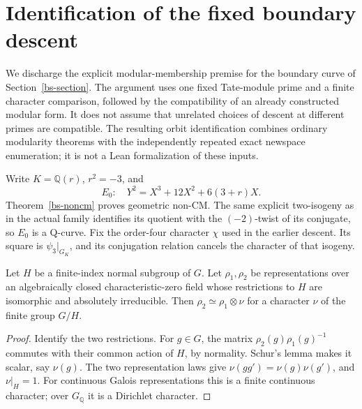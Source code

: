 \section{Identification of the fixed boundary descent}
\label{bm-section}

We discharge the explicit modular-membership premise for the boundary
curve of Section~\ref{bs-section}. The argument uses one fixed
Tate-module prime and a finite character comparison, followed by
the compatibility of an already constructed modular form. It does not
assume that unrelated choices of descent at different primes are
compatible. The resulting orbit identification combines ordinary
modularity theorems with the independently repeated exact newspace
enumeration; it is not a Lean formalization of these inputs.

Write $K=\mathbb Q(r)$, $r^2=-3$, and
\[
 E_0:\quad Y^2=X^3+12X^2+6(3+r)X.
\]
Theorem~\ref{bs-noncm} proves geometric non-CM. The same explicit
two-isogeny as in the actual family identifies its quotient with the
$(-2)$-twist of its conjugate, so $E_0$ is a Q-curve. Fix the
order-four character $\chi$ used in the earlier descent. Its square
is $\psi_3|_{G_K}$, and its conjugation relation cancels the character
of that isogeny.

\begin{lemma}\label{bm-character}
Let $H$ be a finite-index normal subgroup of $G$. Let $\rho_1,\rho_2$
be representations over an algebraically closed characteristic-zero
field whose restrictions to $H$ are isomorphic and absolutely
irreducible. Then $\rho_2\simeq\rho_1\otimes\nu$ for a character
$\nu$ of the finite group $G/H$.
\end{lemma}
\begin{proof}
Identify the two restrictions. For $g\in G$, the matrix
$\rho_2(g)\rho_1(g)^{-1}$ commutes with their common action of $H$,
by normality. Schur's lemma makes it scalar, say $\nu(g)$. The two
representation laws give $\nu(gg')=\nu(g)\nu(g')$, and $\nu|_H=1$.
For continuous Galois representations this is a finite continuous
character; over $G_{\mathbb Q}$ it is a Dirichlet character.
\end{proof}

